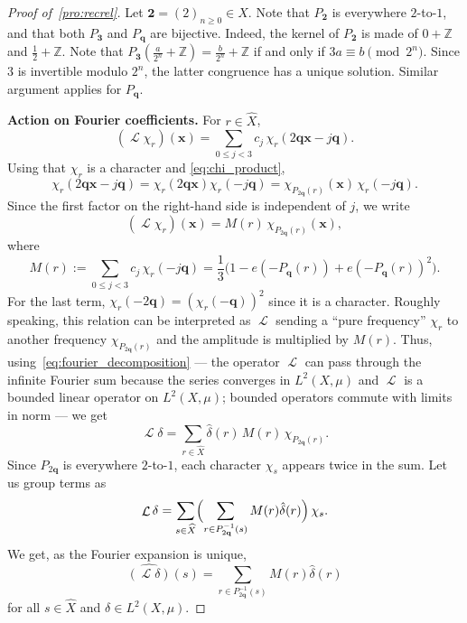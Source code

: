 \documentclass[12pt,reqno]{article}
\DeclareMathOperator{\Lop}{\mathcal{L}}
\begin{document}
\begin{proof}[Proof of~\cref{pro:recrel}]
Let $\mathbf{2} = (2)_{n\ge0} \in X$.
Note that $P_{\mathbf{2}}$ is everywhere $2$-to-$1$, and that both $P_{\mathbf{3}}$ and $P_{\mathbf{q}}$ are bijective. Indeed, the kernel of $P_{\mathbf{2}}$ is made of $0+\mathbb{Z}$ and $\frac12+\mathbb{Z}$. Note that 
$P_{\mathbf{3}}(\frac{a}{2^n}+\mathbb{Z})=\frac{b}{2^n}+\mathbb{Z}$ if and only if $3a\equiv b\pmod{2^n}$. Since $3$ is invertible modulo $2^n$, the latter congruence has a unique solution. Similar argument applies for $P_{\mathbf{q}}$.

{\bf Action on Fourier coefficients.} For $r \in \widehat X$,
\[
    (\Lop\chi_r)(\mathbf{x})
    = \sum_{0\le j<3} c_j\,  \chi_r(2\mathbf{q} \mathbf{x} - j \mathbf{q}).
\]
Using that $\chi_r$ is a character and \eqref{eq:chi_product},
\[
    \chi_r(2\mathbf{q} \mathbf{x} - j\mathbf{q}) = \chi_r(2\mathbf{q} \mathbf{x}) \chi_r(- j\mathbf{q}) = 
    \chi_{P_{2\mathbf{q}}(r)}(\mathbf{x}) \, \chi_r(-j\mathbf{q}).
\]
Since the first factor on the right-hand side is independent of $j$, we write 
\[
    (\Lop\chi_r)(\mathbf{x})
    = M(r)\, \chi_{P_{2\mathbf{q}}(r)}(\mathbf{x}),
\]
where
\begin{equation}\label{eq:defM}
    M(r)
    := \sum_{0\le j<3} c_j\, \chi_r(-j\mathbf{q})
    = \frac{1}{3}\bigl(1 - e(-P_{\mathbf{q}}(r)) + e(-P_{\mathbf{q}}(r))^2\bigr).
  \end{equation}
For the last term, $\chi_r(-2\mathbf{q})=(\chi_r(-\mathbf{q}))^2$ since it is a character. 
Roughly speaking, this relation can be interpreted as $\Lop$ sending a ``pure frequency'' $\chi_r$ to another frequency $\chi_{P_{2\mathbf{q}}(r)}$ and the amplitude is multiplied by $M(r)$. 
Thus, using~\eqref{eq:fourier_decomposition} --- the operator $\Lop$ can pass through the infinite Fourier sum because the series converges in 
$L^2(X,\mu)$ and $\Lop$ is a bounded linear operator on $L^2(X,\mu)$; bounded operators commute with limits in norm --- we get
\[
    \Lop\delta
    = \sum_{r\in\widehat X}
    \hat\delta(r)\,M(r)\,\chi_{P_{2\mathbf{q}}(r)}.
\]
Since $P_{2\mathbf{q}}$ is everywhere $2$-to-$1$, each character $\chi_s$ appears twice in the sum.
Let us group terms as
\[
    \Lop\delta
    = \sum_{s\in\widehat X}
    \Bigl(\sum_{r\in P_{2\mathbf{q}}^{-1}(s)}
      M(r)\hat\delta(r)\Bigr)\, \chi_s.
\]
We get, as the Fourier expansion is unique,
\begin{equation}
    \label{eq:recu_fourier_coeffs}
    \widehat{(\Lop\delta)}(s) = 
    \sum_{r\in P_{2\mathbf{q}}^{-1}(s)}
    M(r)\hat\delta(r)
\end{equation}
for all $s \in \widehat X$ and $\delta \in L^2(X,\mu)$. 


\end{proof}
\end{document}

